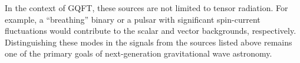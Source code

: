 In the context of GQFT, these sources are not limited to tensor radiation. For example, a ``breathing'' binary or a pulsar with significant spin-current fluctuations would contribute to the scalar and vector backgrounds, respectively. Distinguishing these modes in the signals from the sources listed above remains one of the primary goals of next-generation gravitational wave astronomy.
